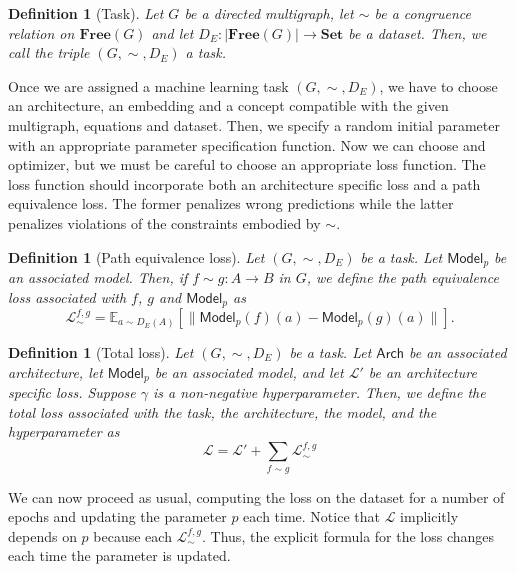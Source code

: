 \documentclass[12pt,a4paper,openright,twoside]{report}
\theoremstyle{plain}
\newtheorem{definition}[proposition]{Definition}
\theoremstyle{definition}
\begin{document}
\begin{definition}[Task]
  Let $G$ be a directed multigraph, let ${\sim}$ be a congruence relation on $\mathbf{Free}(G)$ and let $D_E: |\mathbf{Free}(G)| \to \mathbf{Set}$ be a dataset. Then, we call the triple $(G,{\sim},D_E)$ a task.
\end{definition}

Once we are assigned a machine learning task $(G,{\sim},D_E)$, we have to choose an architecture, an embedding and a concept compatible with the given multigraph, equations and dataset. Then, we specify a random initial parameter with an appropriate parameter specification function. Now we can choose and optimizer, but we must be careful to choose an appropriate loss function. The loss function should incorporate both an architecture specific loss and a path equivalence loss. The former penalizes wrong predictions while the latter penalizes violations of the constraints embodied by ${\sim}$.

\begin{definition}[Path equivalence loss]
  Let $(G,{\sim},D_E)$ be a task. Let $\mathsf{Model}_p$ be an associated model. Then, if $f \sim g: A \to B$ in $G$, we define the path equivalence loss associated with $f$, $g$ and $\mathsf{Model}_p$ as 
  \[\mathcal{L}_{\sim}^{f,g} = \mathbb{E}_{a \sim D_E(A)}[\|\mathsf{Model}_p(f)(a) - \mathsf{Model}_p(g)(a)\|].\]  
\end{definition}

\begin{definition}[Total loss]
  Let $(G,{\sim},D_E)$ be a task. Let $\mathsf{Arch}$ be an associated architecture, let $\mathsf{Model}_p$ be an associated model, and let $\mathcal{L}'$ be an architecture specific loss. Suppose $\gamma$ is a non-negative hyperparameter. Then, we define the total loss associated with the task, the architecture, the model, and the hyperparameter as
  \begin{equation}
    \label{eq: sumoflosses}
    \mathcal{L} = \mathcal{L}' + \sum_{f \sim g}\mathcal{L}_{\sim}^{f,g}
  \end{equation}
\end{definition}

We can now proceed as usual, computing the loss on the dataset for a number of epochs and updating the parameter $p$ each time. Notice that $\mathcal{L}$ implicitly depends on $p$ because each $\mathcal{L}_{\sim}^{f,g}$. Thus, the explicit formula for the loss changes each time the parameter is updated.
\end{document}
